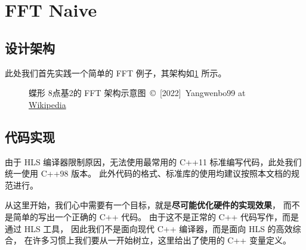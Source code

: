 \documentclass[Chinese,TC,use boldface,simple name]{beaulivre}
\begin{document}
  \section{FFT Naive}

    \subsection{设计架构}

      此处我们首先实践一个简单的 FFT 例子，其架构如\cref{fig:DIT-FFT-butterfly} 所示。
      \begin{figure}[htbp]
        \centering
        
        \caption{蝶形 8点基2的 FFT 架构示意图~\copyright~[2022]~Yangwenbo99 at \href{https://en.wikipedia.org/wiki/File:DIT-FFT-butterfly.svg}{Wikipedia}}
        \label{fig:DIT-FFT-butterfly}
      \end{figure}

    \subsection{代码实现}

      \begin{warning}
        由于 HLS 编译器限制原因，无法使用最常用的 C++11 标准编写代码，此处我们统一使用 C++98 版本。
        此外代码的格式、标准库的使用均建议按照本文档的规范进行。
      \end{warning}

      从这里开始，我们心中需要有一个目标，就是\textbf{尽可能优化硬件的实现效果}，
      而不是简单的写出一个正确的 C++ 代码。
      由于这不是正常的 C++ 代码写作，而是通过 HLS 工具，
      因此我们不是面向现代 C++ 编译器，而是面向 HLS 的高效综合，
      在许多习惯上我们要从一开始树立，这里给出了使用的 C++ 变量定义。
\end{document}
